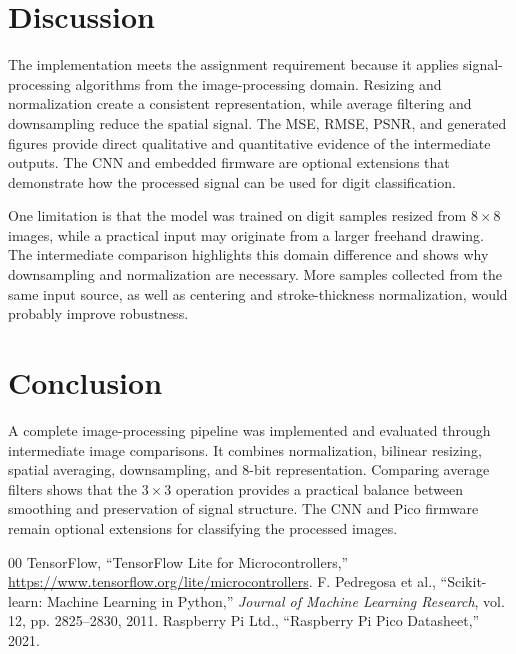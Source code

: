 \documentclass[conference]{IEEEtran}
\begin{document}
\section{Discussion}
The implementation meets the assignment requirement because it applies signal-processing algorithms from the image-processing domain. Resizing and normalization create a consistent representation, while average filtering and downsampling reduce the spatial signal. The MSE, RMSE, PSNR, and generated figures provide direct qualitative and quantitative evidence of the intermediate outputs. The CNN and embedded firmware are optional extensions that demonstrate how the processed signal can be used for digit classification.

One limitation is that the model was trained on digit samples resized from $8 \times 8$ images, while a practical input may originate from a larger freehand drawing. The intermediate comparison highlights this domain difference and shows why downsampling and normalization are necessary. More samples collected from the same input source, as well as centering and stroke-thickness normalization, would probably improve robustness.

\section{Conclusion}
A complete image-processing pipeline was implemented and evaluated through intermediate image comparisons. It combines normalization, bilinear resizing, spatial averaging, downsampling, and 8-bit representation. Comparing average filters shows that the $3 \times 3$ operation provides a practical balance between smoothing and preservation of signal structure. The CNN and Pico firmware remain optional extensions for classifying the processed images.

\begin{thebibliography}{00}
 TensorFlow, ``TensorFlow Lite for Microcontrollers,'' \url{https://www.tensorflow.org/lite/microcontrollers}.
 F. Pedregosa et al., ``Scikit-learn: Machine Learning in Python,'' \emph{Journal of Machine Learning Research}, vol. 12, pp. 2825--2830, 2011.
 Raspberry Pi Ltd., ``Raspberry Pi Pico Datasheet,'' 2021.
\end{thebibliography}
\end{document}
